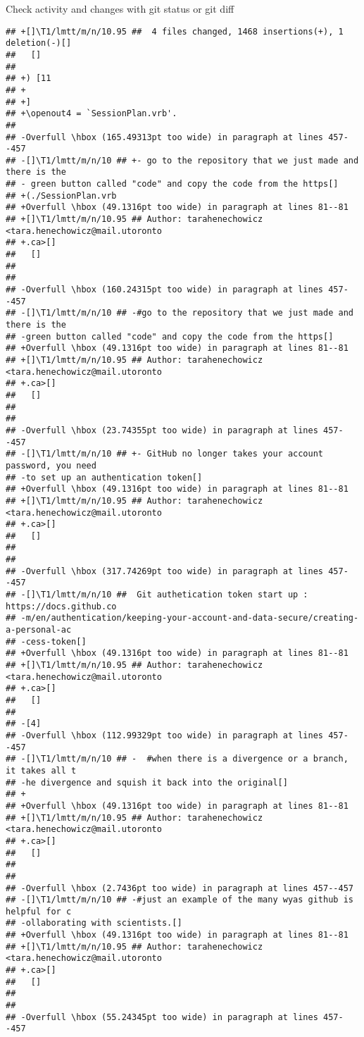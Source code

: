 \documentclass[ignorenonframetext,]{beamer}
\begin{document}
\begin{frame}[fragile]{Check activity and changes with git status or git
diff}
\begin{verbatim}
## +[]\T1/lmtt/m/n/10.95 ##  4 files changed, 1468 insertions(+), 1 deletion(-)[] 
##   []
##  
## +) [11
## +
## +]
## +\openout4 = `SessionPlan.vrb'.
##  
## -Overfull \hbox (165.49313pt too wide) in paragraph at lines 457--457
## -[]\T1/lmtt/m/n/10 ## +- go to the repository that we just made and there is the
## - green button called "code" and copy the code from the https[] 
## +(./SessionPlan.vrb
## +Overfull \hbox (49.1316pt too wide) in paragraph at lines 81--81
## +[]\T1/lmtt/m/n/10.95 ## Author: tarahenechowicz <tara.henechowicz@mail.utoronto
## +.ca>[] 
##   []
##  
##  
## -Overfull \hbox (160.24315pt too wide) in paragraph at lines 457--457
## -[]\T1/lmtt/m/n/10 ## -#go to the repository that we just made and there is the 
## -green button called "code" and copy the code from the https[] 
## +Overfull \hbox (49.1316pt too wide) in paragraph at lines 81--81
## +[]\T1/lmtt/m/n/10.95 ## Author: tarahenechowicz <tara.henechowicz@mail.utoronto
## +.ca>[] 
##   []
##  
##  
## -Overfull \hbox (23.74355pt too wide) in paragraph at lines 457--457
## -[]\T1/lmtt/m/n/10 ## +- GitHub no longer takes your account password, you need 
## -to set up an authentication token[] 
## +Overfull \hbox (49.1316pt too wide) in paragraph at lines 81--81
## +[]\T1/lmtt/m/n/10.95 ## Author: tarahenechowicz <tara.henechowicz@mail.utoronto
## +.ca>[] 
##   []
##  
##  
## -Overfull \hbox (317.74269pt too wide) in paragraph at lines 457--457
## -[]\T1/lmtt/m/n/10 ##  Git authetication token start up : https://docs.github.co
## -m/en/authentication/keeping-your-account-and-data-secure/creating-a-personal-ac
## -cess-token[] 
## +Overfull \hbox (49.1316pt too wide) in paragraph at lines 81--81
## +[]\T1/lmtt/m/n/10.95 ## Author: tarahenechowicz <tara.henechowicz@mail.utoronto
## +.ca>[] 
##   []
##  
## -[4]
## -Overfull \hbox (112.99329pt too wide) in paragraph at lines 457--457
## -[]\T1/lmtt/m/n/10 ## -  #when there is a divergence or a branch, it takes all t
## -he divergence and squish it back into the original[] 
## +
## +Overfull \hbox (49.1316pt too wide) in paragraph at lines 81--81
## +[]\T1/lmtt/m/n/10.95 ## Author: tarahenechowicz <tara.henechowicz@mail.utoronto
## +.ca>[] 
##   []
##  
##  
## -Overfull \hbox (2.7436pt too wide) in paragraph at lines 457--457
## -[]\T1/lmtt/m/n/10 ## -#just an example of the many wyas github is helpful for c
## -ollaborating with scientists.[] 
## +Overfull \hbox (49.1316pt too wide) in paragraph at lines 81--81
## +[]\T1/lmtt/m/n/10.95 ## Author: tarahenechowicz <tara.henechowicz@mail.utoronto
## +.ca>[] 
##   []
##  
##  
## -Overfull \hbox (55.24345pt too wide) in paragraph at lines 457--457

\end{verbatim}
\end{frame}
\end{document}
